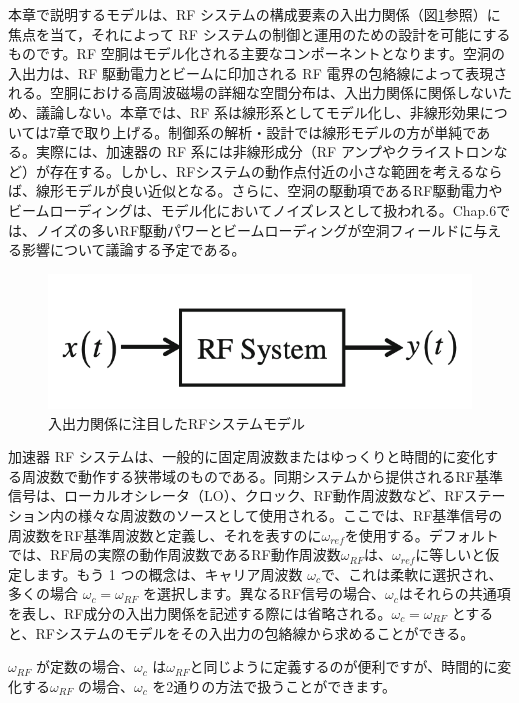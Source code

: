 \documentclass[book]{jlreq}
\begin{document}
本章で説明するモデルは、RF システムの構成要素の入出力関係（図\ref{Fig3.1}参照）に焦点を当て，それによって RF システムの制御と運用のための設計を可能にするものです。RF 空胴はモデル化される主要なコンポーネントとなります。空洞の入出力は、RF 駆動電力とビームに印加される RF 電界の包絡線によって表現される。空胴における高周波磁場の詳細な空間分布は、入出力関係に関係しないため、議論しない。本章では、RF 系は線形系としてモデル化し、非線形効果については7章で取り上げる。制御系の解析・設計では線形モデルの方が単純である。実際には、加速器の RF 系には非線形成分（RF アンプやクライストロンなど）が存在する。しかし、RFシステムの動作点付近の小さな範囲を考えるならば、線形モデルが良い近似となる。さらに、空洞の駆動項であるRF駆動電力やビームローディングは、モデル化においてノイズレスとして扱われる。Chap.6では、ノイズの多いRF駆動パワーとビームローディングが空洞フィールドに与える影響について議論する予定である。
%
\begin{figure}[hbt]
    \begin{center}
      \includegraphics[width=12cm,clip]{figs/Fig3.1.png}
      \caption{入出力関係に注目したRFシステムモデル}
     \label{Fig3.1}
    \end{center}
\end{figure}

加速器 RF システムは、一般的に固定周波数またはゆっくりと時間的に変化する周波数で動作する狭帯域のものである。同期システムから提供されるRF基準信号は、ローカルオシレータ（LO）、クロック、RF動作周波数など、RFステーション内の様々な周波数のソースとして使用される。ここでは、RF基準信号の周波数をRF基準周波数と定義し、それを表すのに$\omega_{ref}$を使用する。デフォルトでは、RF局の実際の動作周波数であるRF動作周波数$\omega_{RF}$は、$\omega_{ref}$に等しいと仮定します。もう 1 つの概念は、キャリア周波数 $\omega_{c}$で、これは柔軟に選択され、多くの場合 $\omega_c = \omega_{RF}$ を選択します。異なるRF信号の場合、$\omega_c$はそれらの共通項を表し、RF成分の入出力関係を記述する際には省略される。$\omega_c = \omega_{RF}$ とすると、RFシステムのモデルをその入出力の包絡線から求めることができる。

$\omega_{RF}$ が定数の場合、$\omega_c$ は$\omega_{RF}$と同じように定義するのが便利ですが、時間的に変化する$\omega_{RF}$ の場合、$\omega_c$ を2通りの方法で扱うことができます。
\end{document}
